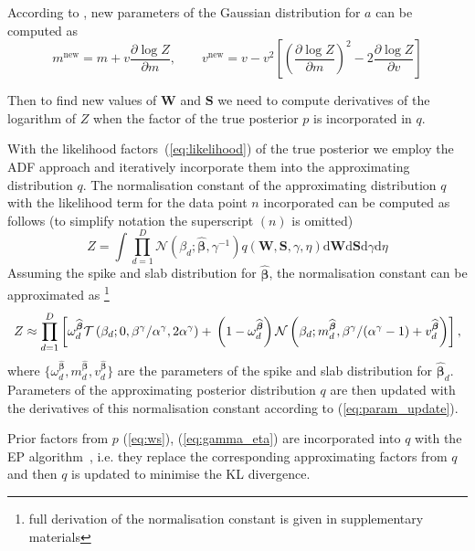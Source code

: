\documentclass{article}
\begin{document}
According to \cite{minka2001thesis}, new parameters of the Gaussian distribution for $a$ can be computed as
\begin{equation}
\label{eq:param_update}
m^{\text{new}} = m + v \frac{\partial \log Z}{\partial m}, \qquad
v^{\text{new}} = v - v^2\left[ \left(\frac{\partial \log Z}{\partial m}\right)^2 - 2 \frac{\partial \log Z}{\partial v}\right]
\end{equation}

Then to find new values of $\mathbf{W}$ and $\mathbf{S}$ we need to compute derivatives of the logarithm of $Z$ when the factor of the true posterior $p$ is incorporated in $q$.

With the likelihood factors~(\ref{eq:likelihood}) of the true posterior we employ the ADF approach and iteratively incorporate them into the approximating distribution $q$. The normalisation constant of the approximating distribution $q$ with the likelihood term for the data point $n$ incorporated can be computed as follows (to simplify notation the superscript $(n)$ is omitted)
\begin{equation}
Z  = \int \prod_{d=1}^{D} \mathcal{N}(\beta_d ; \widehat{\boldsymbol\beta}, \gamma^{-1}) q(\mathbf{W}, \mathbf{S}, \gamma, \eta) \mathrm{d}\mathbf{W} \mathrm{d}\mathbf{S} \mathrm{d}\gamma \mathrm{d}\eta
\end{equation}
Assuming the spike and slab distribution for $\widehat{\boldsymbol\beta}$, the normalisation constant can be approximated as \footnote{full derivation of the normalisation constant is given in supplementary materials}
\begin{equation}
\label{eq:Z}
Z \approx \prod_{d=1}^D \left[\omega^{\widehat{\boldsymbol\beta}}_d  \mathcal{T}\left(\beta_d ; 0, \beta^\gamma / \alpha^\gamma, 2\alpha^\gamma\right) + \vphantom{m^{\widehat{\boldsymbol\beta}}_d} \left(1 - \omega^{\widehat{\boldsymbol\beta}}_d\right)\mathcal{N}\left(\beta_d ; m^{\widehat{\boldsymbol\beta}}_d,  \beta^\gamma / (\alpha^\gamma - 1) + v^{\widehat{\boldsymbol\beta}}_d\right)\right],
\end{equation}
where $\{\omega^{\widehat{\boldsymbol\beta}}_d, m^{\widehat{\boldsymbol\beta}}_d, v^{\widehat{\boldsymbol\beta}}_d\}$ are the parameters of the spike and slab distribution for $\widehat{\boldsymbol\beta}_d$. Parameters of the approximating posterior distribution $q$ are then updated with the derivatives of this normalisation constant according to (\ref{eq:param_update}).

Prior factors from $p$ (\ref{eq:ws}), (\ref{eq:gamma_eta}) are incorporated into $q$ with the EP algorithm~\cite{hernandez2015probabilistic}, i.e. they replace the corresponding approximating factors from $q$ and then $q$ is updated to minimise the KL divergence.
\end{document}
